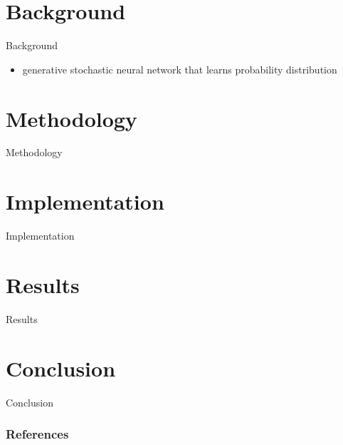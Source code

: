 \documentclass[aspectratio=169]{beamer}
\begin{document}
  \section{Background} %
  \label{sec:background}
    \begin{frame}{Background}
      \begin{itemize}
        \item generative stochastic neural network that learns probability distribution
      \end{itemize}
    \end{frame}

  \section{Methodology} %
  \label{sec:methodology}
    \begin{frame}{Methodology}

    \end{frame}

  \section{Implementation} %
  \label{sec:implementation}
    \begin{frame}{Implementation}

    \end{frame}

  \section{Results} %
  \label{sec:results}
    \begin{frame}{Results}

    \end{frame}

  \section{Conclusion} %
  \label{sec:conclusion}
    \begin{frame}{Conclusion}

    \end{frame}

  \begin{frame}
    \frametitle{References}
    \tiny
    \begin{multicols}{2}
      \nocite{*}
      
    \end{multicols}
  \end{frame}
\end{document}
